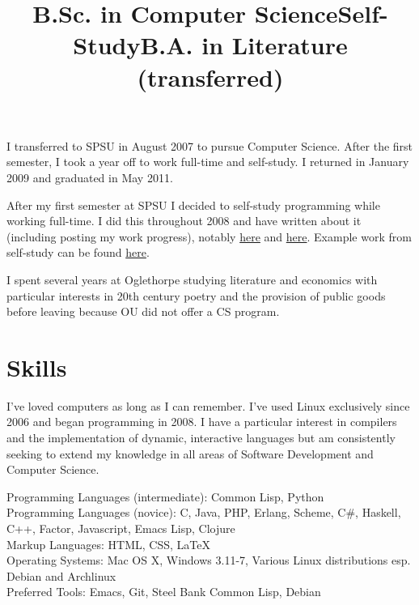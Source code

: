 \documentclass[margintitle,line]{res}
\begin{document}
\begin{resume}
\title{B.Sc. in Computer Science}
\begin{position}
  I transferred to SPSU in August 2007 to pursue Computer Science.
  After the first semester, I took a year off to work full-time and self-study.
  I returned in January 2009 and graduated in May 2011.
\end{position}

\title{Self-Study}
\begin{position}
  After my first semester at SPSU I decided to self-study
  programming while working full-time. I did this
  throughout 2008 and have written about it
  (including posting my work progress), notably
  \href{http://blog.redlinernotes.com/posts/Leaving-College-to-Leverage-Compulsion.html}{here} and
  \href{http://blog.redlinernotes.com/posts/Spring-2008-Schedule-and-Syllabus.html}{here}.
  Example work from self-study can be found
  \href{http://blog.redlinernotes.com/posts/SICP-Section-13.html}{here}.
\end{position}

\title{B.A. in Literature (transferred)}
\begin{position}
  I spent several years at Oglethorpe studying literature
  and economics with particular interests in 20th century
  poetry and the provision of public goods before leaving
  because OU did not offer a CS program.
\end{position}


\setlength{\parskip}{1ex}


\section{Skills}

I've loved computers as long as I can remember. I've used Linux exclusively
since 2006 and began programming in 2008. I have a particular interest in
compilers and the implementation of dynamic, interactive languages but am
consistently seeking to extend my knowledge in all areas of Software Development
and Computer Science.

Programming Languages (intermediate): Common Lisp, Python \\
Programming Languages (novice): C, Java, PHP, Erlang, Scheme, C\#, Haskell,
C++, Factor, Javascript, Emacs Lisp, Clojure \\
Markup Languages: HTML, CSS, LaTeX \\
Operating Systems: Mac OS X, Windows 3.11-7, Various Linux distributions
esp. Debian and Archlinux \\
Preferred Tools: Emacs, Git, Steel Bank Common Lisp, Debian \\


\end{resume}
\end{document}
